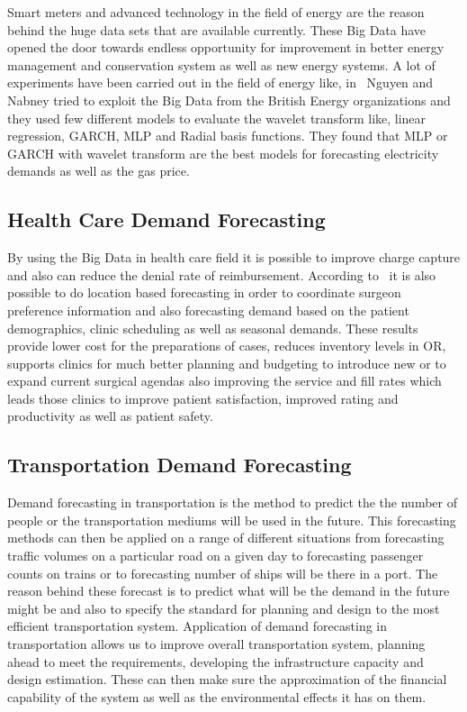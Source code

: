 Smart meters and advanced technology in the field of energy are the reason behind the huge data sets that are available currently. These Big Data have opened the door towards endless opportunity for improvement in better energy management and conservation system as well as new energy systems. A lot of experiments have been carried out in the field of energy like, in~\cite{nguyen2010short} Nguyen and Nabney tried to exploit the Big Data from the British Energy organizations and they used few different models to evaluate the wavelet transform like, linear regression, GARCH, MLP and Radial basis functions. They found that MLP or GARCH with wavelet transform are the best models for forecasting electricity demands as well as the gas price. 


\subsection{Health Care Demand Forecasting}
\label{Health}

By using the Big Data in health care field it is possible to improve charge capture and also can reduce the denial rate of reimbursement. According to~\cite{callahan2004effective} it is also possible to do location based forecasting in order to coordinate surgeon preference information and also forecasting demand based on the patient demographics, clinic scheduling as well as seasonal demands. These results provide lower cost for the preparations of cases, reduces inventory levels in OR, supports clinics for much better planning and budgeting to introduce new or to expand current surgical agendas also improving the service and fill rates which leads those clinics to improve patient satisfaction, improved rating and productivity as well as patient safety. 


\subsection{Transportation Demand Forecasting}
\label{Transportation}
Demand forecasting in transportation is the method to predict the the number of people or the transportation mediums will be used in the future. This forecasting methods can then be applied on a range of different situations from forecasting traffic volumes on a particular road on a given day to forecasting passenger counts on trains or to forecasting number of ships will be there in a port. The reason behind these forecast is to predict what will be the demand in the future might be and also to specify the standard for planning and design to the most efficient transportation system. Application of demand forecasting in transportation allows us to improve overall transportation system, planning ahead to meet the requirements, developing the infrastructure capacity and design estimation. These can then make sure the approximation of the financial capability of the system as well as the environmental effects it has on them.   





